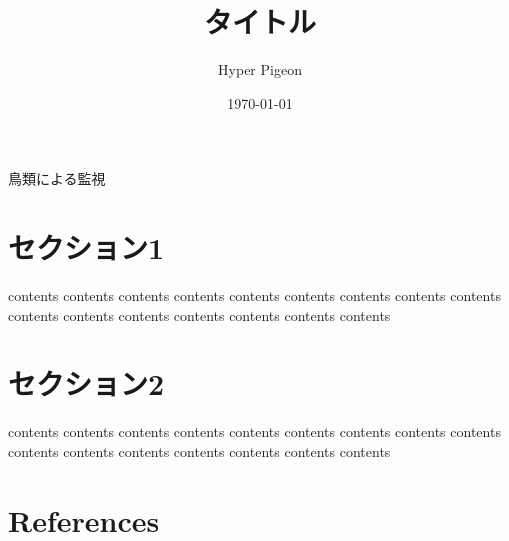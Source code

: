 \documentclass[uplatex]{jsarticle}
\begin{document}
\title{\huge タイトル}
\author{Hyper Pigeon}
\date{\today}
\maketitle

鳥類による監視\cite{bibtest}

\section{セクション1}

contents contents contents contents
contents contents contents contents
contents contents contents contents
contents contents contents contents

\section{セクション2}

contents contents contents contents
contents contents contents contents
contents contents contents contents
contents contents contents contents

\section{References}

{\small


}
\end{document}
